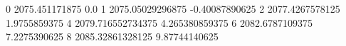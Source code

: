0 2075.451171875 0.0
1 2075.05029296875 -0.40087890625
2 2077.4267578125 1.9755859375
4 2079.716552734375 4.265380859375
6 2082.6787109375 7.2275390625
8 2085.32861328125 9.87744140625
